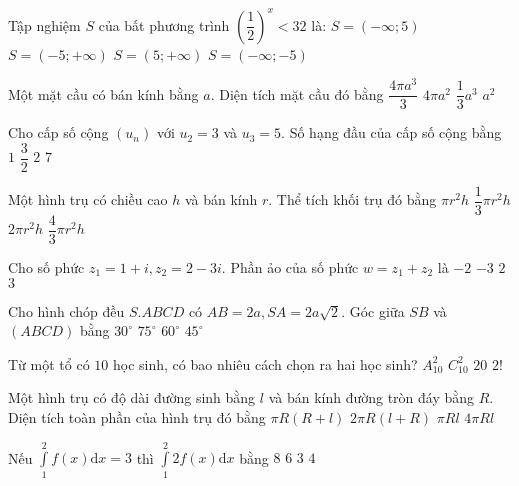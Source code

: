 \begin{ex}%
Tập nghiệm $S$ của bất phương trình $\left(\dfrac{1}{2}\right)^{x}<32$ là:
\choice
{$S=(-\infty; 5)$}
{\True $S=(-5;+\infty)$}
{$S=(5;+\infty)$}
{$S=(-\infty;-5)$}

\end{ex}
\begin{ex}%
Một mặt cầu có bán kính bằng $a$. Diện tích mặt cầu đó bằng
\choice
{$\dfrac{4\pi a^3}{3}$}
{\True $4\pi a^2$}
{$\dfrac{1}{3} a^3$}
{$a^2$}

\end{ex}
\begin{ex}%
Cho cấp số cộng $\left(u_n\right)$ với $u_2=3$ và $u_3=5$. Số hạng đầu của cấp số cộng bằng
\choice
{\True $1$}
{$\dfrac{3}{2}$}
{$2$}
{$7$}

\end{ex}
\begin{ex}%
Một hình trụ có chiều cao $h$ và bán kính $r$. Thể tích khối trụ đó bằng
\choice
{\True $\pi r^2 h$}
{$\dfrac{1}{3} \pi r^2 h$}
{$2\pi r^2 h$}
{$\dfrac{4}{3} \pi r^2 h$}

\end{ex}
\begin{ex}%
Cho số phức $z_1=1+i, z_2=2-3 i$. Phần ảo của số phức $w=z_1+z_2$ là
\choice
{\True $-2$}
{$-3$}
{$2$}
{$3$}

\end{ex}
\begin{ex}%
Cho hình chóp đều $S.ABCD$ có $AB=2 a, SA=2 a \sqrt{2}$. Góc giữa $SB$ và $(ABCD)$ bằng
\choice
{$30^{\circ}$}
{$75^{\circ}$}
{\True $60^{\circ}$}
{$45^{\circ}$}

\end{ex}
\begin{ex}%
Từ một tổ có $10$ học sinh, có bao nhiêu cách chọn ra hai học sinh?
\choice
{$A_{10}^2$}
{\True $C_{10}^2$}
{$20$}
{$2!$}

\end{ex}
\begin{ex}%
Một hình trụ có độ dài đường sinh bằng $l$ và bán kính đường tròn đáy bằng $R$. Diện tích toàn phần của hình trụ đó bằng
\choice
{$\pi R(R+l)$}
{\True $2\pi R(l+R)$}
{$\pi R l$}
{$4\pi R l$}

\end{ex}
\begin{ex}%
Nếu $\displaystyle\int\limits_1^2 f(x) \mathrm{d} x=3$ thì $\displaystyle\int\limits_1^2 2 f(x) \mathrm{d} x$ bằng
\choice
{$8$}
{\True $6$}
{$3$}
{$4$}

\end{ex}
